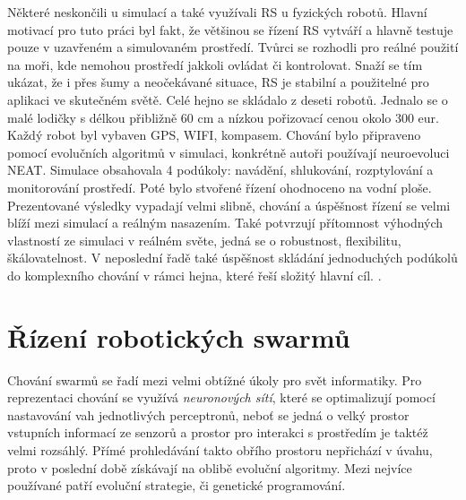 Některé neskončili u simulací a také využívali RS u fyzických robotů. Hlavní motivací pro tuto práci byl fakt, že většinou se řízení RS vytváří  a hlavně testuje pouze v uzavřeném a simulovaném prostředí. Tvůrci se rozhodli pro reálné použití na moři, kde nemohou prostředí jakkoli ovládat či kontrolovat. Snaží se tím ukázat, že i přes šumy a neočekávané situace, RS je stabilní a použitelné pro aplikaci ve skutečném světě. Celé hejno se skládalo z deseti robotů. Jednalo se o malé lodičky s délkou přibližně 60 cm a nízkou pořizovací cenou okolo 300 eur. Každý robot byl  vybaven GPS, WIFI, kompasem. Chování bylo připraveno pomocí evolučních algoritmů v simulaci, konkrétně autoři používají neuroevoluci NEAT. Simulace obsahovala 4 podúkoly: navádění, shlukování, rozptylování a monitorování prostředí. Poté bylo stvořené řízení ohodnoceno na vodní ploše. Prezentované výsledky vypadají velmi slibně, chování a úspěšnost řízení se velmi blíží mezi simulací a reálným nasazením. Také potvrzují přítomnost výhodných vlastností ze simulaci v reálném světe, jedná se o robustnost, flexibilitu, škálovatelnost. V neposlední řadě také úspěšnost skládání jednoduchých podúkolů do komplexního chování v rámci hejna, které řeší složitý hlavní cíl.  \citep{aquaticRobots}. 
\section{Řízení robotických swarmů}
Chování swarmů se řadí mezi velmi obtížné úkoly pro svět informatiky. Pro reprezentaci chování se využívá \textit{neuronových sítí}, které se optimalizují pomocí nastavování vah jednotlivých perceptronů, neboť se jedná o velký prostor vstupních informací ze senzorů a prostor pro interakci s prostředím je taktéž velmi rozsáhlý. Přímé prohledávání takto obřího prostoru nepřichází v úvahu, proto v poslední době získávají na oblibě evoluční algoritmy. Mezi nejvíce používané patří evoluční strategie, či genetické programování. \par 


